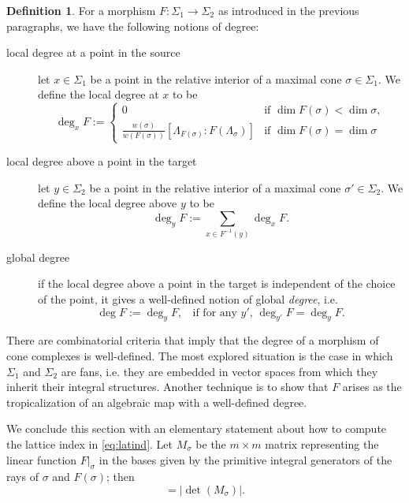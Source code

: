 \documentclass[11pt,reqno]{amsart}
\theoremstyle{definition}
\newtheorem{definition}[theorem]{Definition}
\begin{document}
\begin{definition}\label{def:degrees}
    For a morphism $F:\Sigma_1\to \Sigma_2$ as introduced in the previous paragraphs, we have the following notions of degree:
    \begin{description}
        \item[local degree at a point in the source] let $x\in \Sigma_1$ be a point in the relative interior of a maximal cone $\sigma\in \Sigma_1$. We define the {local degree at $x$} to be
        \begin{equation} \label{eq:latind}
            \deg_xF:= 
            \left\{
            \begin{array}{cl}
                0 & \mbox{if $\dim F(\sigma) <\dim \sigma$}, \\
              \frac{w(\sigma)}{w(F(\sigma))}[\Lambda_{F(\sigma)}: F(\Lambda_\sigma)]   &  \mbox{if $\dim F(\sigma) =\dim \sigma$}
            \end{array}
            \right.
        \end{equation}
        \item[local degree above a point in the target]  let $y\in \Sigma_2$ be a point in the relative interior of a maximal cone $\sigma'\in \Sigma_2$. We define the {local degree above $y$} to be
        \begin{equation}
            \deg_yF:= \sum_{x\in F^{-1}(y)} \deg_x F.
        \end{equation}
        \item[global degree] if the local degree above a point in the target is independent of the choice of the point, it gives a well-defined notion of global {\it degree}, i.e.
        \begin{equation}
            \deg F:= \deg_y F, \ \  \ \ \mbox{if for any $y'$, $\deg_{y'} F= \deg_y F$}. 
        \end{equation}
           \end{description}
\end{definition}
There are combinatorial criteria that imply that the degree of a morphism of cone complexes is well-defined. The most explored situation is the case in which $\Sigma_1$ and $\Sigma_2$ are fans, i.e. they are embedded in vector spaces from which they inherit their integral structures. Another technique is to show that $F$ arises as the tropicalization of an algebraic map with a well-defined degree.

We conclude this section with an elementary statement about how to compute the lattice index in \eqref{eq:latind}. Let $M_\sigma$ be the $m\times m$ matrix representing the linear function $F|_{\sigma}$ in the bases given by the primitive integral generators of the rays of $\sigma$ and $F(\sigma)$; then
\begin{equation}
  [\Lambda_{F(\sigma)}: F(\Lambda_\sigma)]   = \left|
\det (M_\sigma)
  \right|.
\end{equation}
\end{document}
